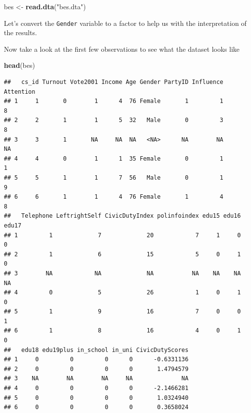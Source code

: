 \documentclass[]{article}
\newenvironment{Shaded}{\begin{snugshade}}{\end{snugshade}}
\newcommand{\KeywordTok}[1]{\textcolor[rgb]{0.13,0.29,0.53}{\textbf{{#1}}}}
\newcommand{\DataTypeTok}[1]{\textcolor[rgb]{0.13,0.29,0.53}{{#1}}}
\newcommand{\DecValTok}[1]{\textcolor[rgb]{0.00,0.00,0.81}{{#1}}}
\newcommand{\StringTok}[1]{\textcolor[rgb]{0.31,0.60,0.02}{{#1}}}
\newcommand{\NormalTok}[1]{{#1}}
\theoremstyle{definition}
\theoremstyle{definition}
\theoremstyle{remark}
\begin{document}
\begin{Shaded}
\begin{Highlighting}[]
\NormalTok{bes <-}\StringTok{ }\KeywordTok{read.dta}\NormalTok{(}\StringTok{"bes.dta"}\NormalTok{)}
\end{Highlighting}
\end{Shaded}

Let's convert the \texttt{Gender} variable to a factor to help us with
the interpretation of the results.

\begin{Shaded}
\end{Shaded}

Now take a look at the first few observations to see what the dataset
looks like

\begin{Shaded}
\begin{Highlighting}[]
\KeywordTok{head}\NormalTok{(bes)}
\end{Highlighting}
\end{Shaded}

\begin{verbatim}
##   cs_id Turnout Vote2001 Income Age Gender PartyID Influence Attention
## 1     1       0        1      4  76 Female       1         1         8
## 2     2       1        1      5  32   Male       0         3         8
## 3     3       1       NA     NA  NA   <NA>      NA        NA        NA
## 4     4       0        1      1  35 Female       0         1         1
## 5     5       1        1      7  56   Male       0         1         9
## 6     6       1        1      4  76 Female       1         4         8
##   Telephone LeftrightSelf CivicDutyIndex polinfoindex edu15 edu16 edu17
## 1         1             7             20            7     1     0     0
## 2         1             6             15            5     0     1     0
## 3        NA            NA             NA           NA    NA    NA    NA
## 4         0             5             26            1     0     1     0
## 5         1             9             16            7     0     0     1
## 6         1             8             16            4     0     1     0
##   edu18 edu19plus in_school in_uni CivicDutyScores
## 1     0         0         0      0      -0.6331136
## 2     0         0         0      0       1.4794579
## 3    NA        NA        NA     NA              NA
## 4     0         0         0      0      -2.1466281
## 5     0         0         0      0       1.0324940
## 6     0         0         0      0       0.3658024
\end{verbatim}
\end{document}
